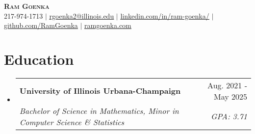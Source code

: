 \documentclass[letterpaper,11pt]{article}
\makeatletter
\newcommand{\resumeEduchead}[4]{
  \vspace{-2pt}\item
    \begin{tabular*}{0.97\textwidth}[t]{l@{\extracolsep{\fill}}r}
      \textbf{#1} & #2 \\
      \textit{\small#3} & \textit{\small #4} \\
    \end{tabular*}\vspace{-7pt}}
\newcommand{\resumeSubHeadingListStart}{\begin{itemize}[leftmargin=0.15in, label={}]}
\newcommand{\resumeSubHeadingListEnd}{\end{itemize}}
\makeatother
\begin{document}
\begin{center}
    \textbf{\Huge \scshape Ram Goenka} \\ \vspace{1pt}
    \small 217-974-1713 $|$ \href{mailto:rgoenka2@illinois.edu}{\underline{rgoenka2@illinois.edu}} $|$ 
    \href{https://www.linkedin.com/in/ram-goenka/}{\underline{linkedin.com/in/ram-goenka/}} $|$
    \href{https://github.com/RamGoenka}{\underline{github.com/RamGoenka}} $|$
    \href{http://ramgoenka.com/}{\underline{ramgoenka.com}}
\end{center}

\section{Education}
  \resumeSubHeadingListStart
    \resumeEduchead
      {University of Illinois Urbana-Champaign}{Aug. 2021 - May 2025}
      {Bachelor of Science in Mathematics, Minor in Computer Science \& Statistics}{GPA: 3.71}
  \resumeSubHeadingListEnd


\end{document}
